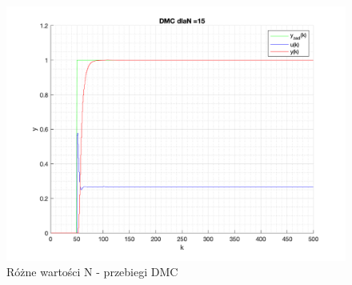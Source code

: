 \documentclass[a4paper, 11pt]{article}
\begin{document}
\begin{enumerate}
 \begin{figure} [h]
\centering
 \includegraphics[width=\linewidth]{./ModelsP4_N/P4_DMC_N_15_png.png} 
 \caption[Różne wartości N - przebiegi DMC]
{Różne wartości N - przebiegi DMC}
 \end{figure}
 

\end{enumerate}
\end{document}
